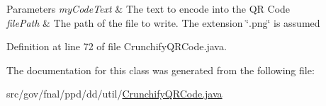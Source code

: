 \begin{DoxyParams}{Parameters}
{\em my\-Code\-Text} & The text to encode into the Q\-R Code \\
\hline
{\em file\-Path} & The path of the file to write. The extension \char`\"{}.\-png\char`\"{} is assumed \\
\hline
\end{DoxyParams}


Definition at line 72 of file Crunchify\-Q\-R\-Code.\-java.



The documentation for this class was generated from the following file\-:\begin{DoxyCompactItemize}
\item 
src/gov/fnal/ppd/dd/util/\hyperlink{CrunchifyQRCode_8java}{Crunchify\-Q\-R\-Code.\-java}\end{DoxyCompactItemize}
